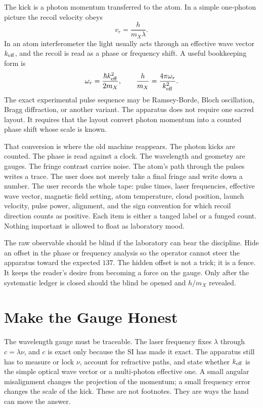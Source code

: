 The kick is a photon momentum transferred to the atom. In a simple one-photon picture the recoil velocity obeys
\[
  v_r = \frac{h}{m_X\lambda}.
\]
In an atom interferometer the light usually acts through an effective wave vector \(k_{\rm eff}\), and the
recoil is read as a phase or frequency shift. A useful bookkeeping form is
\[
  \omega_r = \frac{\hbar k_{\rm eff}^2}{2m_X},
  \qquad
  \frac{h}{m_X} = \frac{4\pi\omega_r}{k_{\rm eff}^2}.
\]
The exact experimental pulse sequence may be Ramsey-Borde, Bloch oscillation, Bragg diffraction, or another
variant. The apparatus does not require one sacred layout. It requires that the layout convert photon momentum
into a counted phase shift whose scale is known.

That conversion is where the old machine reappears. The photon kicks are counted. The phase is read against a
clock. The wavelength and geometry are gauges. The fringe contrast carries noise. The atom's path through the
pulses writes a trace. The user does not merely take a final fringe and write down a number. The user records the
whole tape: pulse times, laser frequencies, effective wave vector, magnetic field setting, atom temperature,
cloud position, launch velocity, pulse power, alignment, and the sign convention for which recoil direction
counts as positive. Each item is either a tanged label or a funged count. Nothing important is allowed to float
as laboratory mood.

The raw observable should be blind if the laboratory can bear the discipline. Hide an offset in the phase or
frequency analysis so the operator cannot steer the apparatus toward the expected \(137\). The hidden offset is
not a trick; it is a fence. It keeps the reader's desire from becoming a force on the gauge. Only after the
systematic ledger is closed should the blind be opened and \(h/m_X\) revealed.

\section{Make the Gauge Honest}

The wavelength gauge must be traceable. The laser frequency fixes \(\lambda\) through \(c=\lambda\nu\), and
\(c\) is exact only because the SI has made it exact. The apparatus still has to measure or lock \(\nu\), account
for refractive paths, and state whether \(k_{\rm eff}\) is the simple optical wave vector or a multi-photon
effective one. A small angular misalignment changes the projection of the momentum; a small frequency error
changes the scale of the kick. These are not footnotes. They are ways the hand can move the answer.

